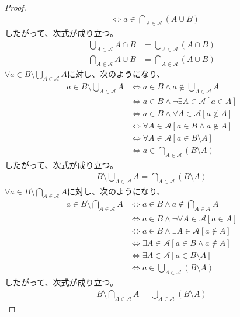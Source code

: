 \documentclass[a4paper]{jsarticle}
\begin{document}
\begin{proof}
\begin{align*}
&\Leftrightarrow a \in \bigcap_{A \in \mathcal{A}} (A \cup B)
\end{align*}
したがって、次式が成り立つ。
\begin{align*}
\bigcup_{A \in \mathcal{A}} A \cap B &= \bigcup_{A \in \mathcal{A}} (A \cap B)\\
\bigcap_{A \in \mathcal{A}} A \cup B &= \bigcap_{A \in \mathcal{A}} (A \cup B)
\end{align*}
$\forall a \in B \setminus \bigcup_{A \in \mathcal{A}} A$に対し、次のようになり、
\begin{align*}
a \in B \setminus \bigcup_{A \in \mathcal{A}} A &\Leftrightarrow a \in B \land a \notin \bigcup_{A \in \mathcal{A}} A\\
&\Leftrightarrow a \in B \land \neg\exists A \in \mathcal{A}[ a \in A]\\
&\Leftrightarrow a \in B \land \forall A \in \mathcal{A}[ a \notin A]\\
&\Leftrightarrow \forall A \in \mathcal{A}[ a \in B \land a \notin A]\\
&\Leftrightarrow \forall A \in \mathcal{A}[ a \in B \setminus A]\\
&\Leftrightarrow a \in \bigcap_{A \in \mathcal{A}} (B \setminus A)
\end{align*}
したがって、次式が成り立つ。
\begin{align*}
B \setminus \bigcup_{A \in \mathcal{A}} A = \bigcap_{A \in \mathcal{A}} (B \setminus A)
\end{align*}
$\forall a \in B \setminus \bigcap_{A \in \mathcal{A}} A$に対し、次のようになり、
\begin{align*}
a \in B \setminus \bigcap_{A \in \mathcal{A}} A &\Leftrightarrow a \in B \land a \notin \bigcap_{A \in \mathcal{A}} A\\
&\Leftrightarrow a \in B \land \neg\forall A \in \mathcal{A}[ a \in A]\\
&\Leftrightarrow a \in B \land \exists A \in \mathcal{A}[ a \notin A]\\
&\Leftrightarrow \exists A \in \mathcal{A}[ a \in B \land a \notin A]\\
&\Leftrightarrow \exists A \in \mathcal{A}[ a \in B \setminus A]\\
&\Leftrightarrow a \in \bigcup_{A \in \mathcal{A}} (B \setminus A)
\end{align*}
したがって、次式が成り立つ。
\begin{align*}
B \setminus \bigcap_{A \in \mathcal{A}} A = \bigcup_{A \in \mathcal{A}} (B \setminus A)
\end{align*}
\end{proof}
\end{document}
